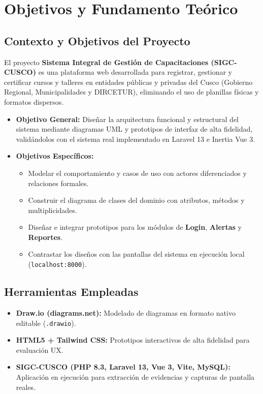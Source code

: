 \section{Objetivos y Fundamento Teórico}

\subsection{Contexto y Objetivos del Proyecto}
El proyecto \textbf{Sistema Integral de Gestión de Capacitaciones (SIGC-CUSCO)} es una plataforma web desarrollada para registrar, gestionar y certificar cursos y talleres en entidades públicas y privadas del Cusco (Gobierno Regional, Municipalidades y DIRCETUR), eliminando el uso de planillas físicas y formatos dispersos. 

\begin{itemize}[nosep]
    \item \textbf{Objetivo General:} Diseñar la arquitectura funcional y estructural del sistema mediante diagramas UML y prototipos de interfaz de alta fidelidad, validándolos con el sistema real implementado en Laravel 13 e Inertia Vue 3.
    \item \textbf{Objetivos Específicos:}
    \begin{itemize}[nosep]
        \item Modelar el comportamiento y casos de uso con actores diferenciados y relaciones formales.
        \item Construir el diagrama de clases del dominio con atributos, métodos y multiplicidades.
        \item Diseñar e integrar prototipos para los módulos de \textbf{Login}, \textbf{Alertas} y \textbf{Reportes}.
        \item Contrastar los diseños con las pantallas del sistema en ejecución local (\texttt{localhost:8000}).
    \end{itemize}
\end{itemize}

\subsection{Herramientas Empleadas}
\begin{itemize}[nosep]
    \item \textbf{Draw.io (diagrams.net):} Modelado de diagramas en formato nativo editable (\texttt{.drawio}).
    \item \textbf{HTML5 + Tailwind CSS:} Prototipos interactivos de alta fidelidad para evaluación UX.
    \item \textbf{SIGC-CUSCO (PHP 8.3, Laravel 13, Vue 3, Vite, MySQL):} Aplicación en ejecución para extracción de evidencias y capturas de pantalla reales.
\end{itemize}
